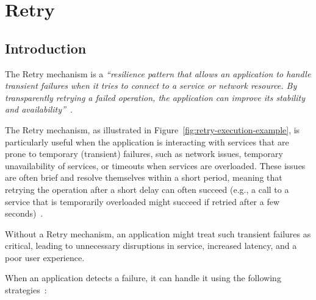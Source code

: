 \chapter{Retry}\label{ch:retry}



\section{Introduction}\label{sec:retry-context}

The Retry mechanism is a \textit{\enquote{resilience pattern
that allows an application to handle transient failures when it tries to connect to a service or network resource.
By transparently retrying a failed operation,
    the application can improve its stability and availability}}~\cite{microsoft-retry-pattern}.

The Retry mechanism, as illustrated in Figure~\ref{fig:retry-execution-example},
is particularly useful when the application is interacting with services that are prone to temporary
(transient) failures, such as network issues,
temporary unavailability of services, or timeouts when services are overloaded.
These issues are often brief and resolve themselves within a short period,
meaning that retrying the operation after a short delay can often succeed
(e.g.,
a call to a service that is temporarily overloaded might succeed
if retried after a few seconds)~\cite{microsoft-retry-pattern}.

Without a Retry mechanism, an application might treat such transient failures as critical,
leading to unnecessary disruptions in service, increased latency, and a poor user experience.

When an application detects a failure, it can handle it using the following strategies~\cite{microsoft-retry-pattern}:

